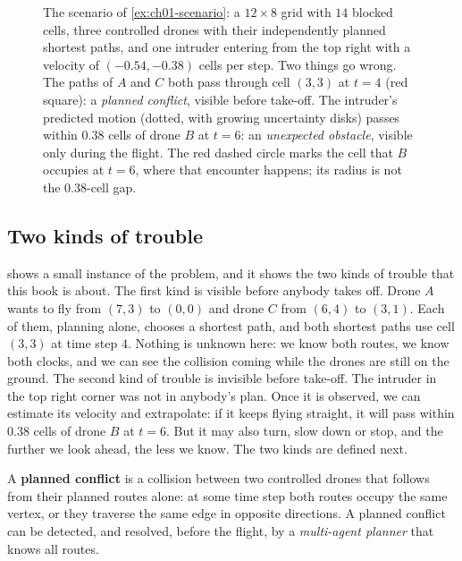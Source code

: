 \begin{figure}[tb]
  \centering
  \caption{The scenario of \cref{ex:ch01-scenario}: a $12\times 8$ grid with
    $14$ blocked cells, three controlled drones with their independently planned
    shortest paths, and one intruder entering from the top right with a velocity of
    $(-0.54,-0.38)$ cells per step. Two things go wrong. The paths of $A$ and $C$ both
    pass through cell $(3,3)$ at $t=4$ (red square): a \emph{planned conflict}, visible
    before take-off. The intruder's predicted motion (dotted, with growing uncertainty
    disks) passes within $0.38$ cells of drone $B$ at $t=6$: an
    \emph{unexpected obstacle}, visible only during the flight. The red dashed circle
    marks the cell that $B$ occupies at $t=6$, where that encounter happens; its
    radius is not the $0.38$-cell gap.}
  \label{fig:ch01-scenario}
\end{figure}

\subsection{Two kinds of trouble}
\label{sec:ch01-two-kinds}

 shows a small instance of the problem, and it shows the two
kinds of trouble that this book is about. The first kind is visible before anybody
takes off. Drone $A$ wants to fly from $(7,3)$ to $(0,0)$ and drone $C$ from $(6,4)$ to
$(3,1)$. Each of them, planning alone, chooses a shortest path, and both shortest paths
use cell $(3,3)$ at time step $4$. Nothing is unknown here: we know both routes, we
know both clocks, and we can see the collision coming while the drones are still on
the ground. The second kind of trouble is invisible before take-off. The intruder in
the top right corner was not in anybody's plan. Once it is observed, we can estimate
its velocity and extrapolate: if it keeps flying straight, it will pass within $0.38$
cells of drone $B$ at $t=6$. But it may also turn, slow down or stop, and the further
we look ahead, the less we know. The two kinds are defined next.

\begin{definition}
\label{def:ch01-planned-conflict}
A \textbf{planned conflict} is a collision between two
controlled drones that follows from their planned routes alone: at some time step
both routes occupy the same vertex, or they traverse the same edge in opposite
directions. A planned conflict can be detected, and resolved, before the flight, by a
\emph{multi-agent planner} that knows all routes.
\end{definition}

